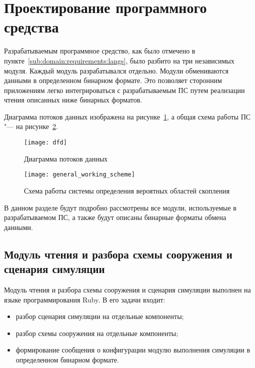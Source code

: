 \section{Проектирование программного средства} %
\label{sec:development}

Разрабатываемым программное средство, как было отмечено в пункте~\ref{sub:domain:requirements:langs}, было разбито на три независимых модуля.
Каждый модуль разрабатывался отдельно. Модули обмениваются данными в определенном бинарном формате.
Это позволяет сторонним приложениям легко интегрироваться с разрабатываемым ПС путем реализации чтения описанных ниже бинарных форматов.

Диаграмма потоков данных изображена на рисунке~\ref{sec:development:data_flow_diagramm}, а общая схема работы ПС "--- на рисунке~\ref{sec:development:general_working_scheme}.

\begin{figure}[ht]
  \texttt{[image: dfd]}
  \caption{Диаграмма потоков данных}
  \label{sec:development:data_flow_diagramm}
\end{figure}

\begin{figure}[!ht]
  \centering
  \texttt{[image: general\_working\_scheme]}
  \caption{Схема работы системы определения вероятных областей скопления}
  \label{sec:development:general_working_scheme}
\end{figure}

В данном разделе будут подробно рассмотрены все модули, используемые в разрабатываемом ПС, а также будут описаны бинарные форматы обмена данными.

\subsection{Модуль чтения и разбора схемы сооружения и сценария симуляции}
\label{sec:development:preprocessor}

Модуль чтения и разбора схемы сооружения и сценария симуляции выполнен на языке программирования Ruby.
В его задачи входит:
\begin{itemize}
  \item разбор сценария симуляции на отдельные компоненты;
  \item разбор схемы сооружения на отдельные компоненты;
  \item формирование сообщения о конфигурации модулю выполнения симуляции в определенном бинарном формате.
\end{itemize}

